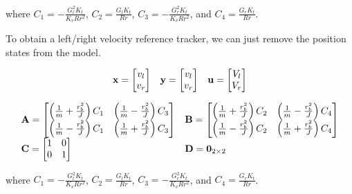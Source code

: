 where $C_1 = -\frac{G_l^2 K_t}{K_v R r^2}$, $C_2 = \frac{G_l K_t}{Rr}$,
$C_3 = -\frac{G_r^2 K_t}{K_v R r^2}$, and $C_4 = \frac{G_r K_t}{Rr}$.

To obtain a left/right velocity \gls{reference} tracker, we can just remove the
position \glspl{state} from the \gls{model}.

\begin{theorem}
  \label{thm:ramsete_decoupled_ref_tracker}
  \begin{equation*}
    \begin{array}{ccc}
      \mathbf{x} =
      \begin{bmatrix}
        v_l \\
        v_r
      \end{bmatrix} &
      \mathbf{y} =
      \begin{bmatrix}
        v_l \\
        v_r
      \end{bmatrix} &
      \mathbf{u} =
      \begin{bmatrix}
        V_l \\
        V_r
      \end{bmatrix}
    \end{array}
  \end{equation*}

  \begin{equation}
    \begin{array}{ll}
      \mathbf{A} =
      \begin{bmatrix}
        \left(\frac{1}{m} + \frac{r_b^2}{J}\right) C_1 &
        \left(\frac{1}{m} - \frac{r_b^2}{J}\right) C_3 \\
        \left(\frac{1}{m} - \frac{r_b^2}{J}\right) C_1 &
        \left(\frac{1}{m} + \frac{r_b^2}{J}\right) C_3
      \end{bmatrix} &
      \mathbf{B} =
      \begin{bmatrix}
        \left(\frac{1}{m} + \frac{r_b^2}{J}\right) C_2 &
        \left(\frac{1}{m} - \frac{r_b^2}{J}\right) C_4 \\
        \left(\frac{1}{m} - \frac{r_b^2}{J}\right) C_2 &
        \left(\frac{1}{m} + \frac{r_b^2}{J}\right) C_4
      \end{bmatrix} \\
      \mathbf{C} =
      \begin{bmatrix}
        1 & 0 \\
        0 & 1 \\
      \end{bmatrix} &
      \mathbf{D} = \mathbf{0}_{2 \times 2}
    \end{array}
  \end{equation}

  where $C_1 = -\frac{G_l^2 K_t}{K_v R r^2}$, $C_2 = \frac{G_l K_t}{Rr}$,
  $C_3 = -\frac{G_r^2 K_t}{K_v R r^2}$, and $C_4 = \frac{G_r K_t}{Rr}$.
\end{theorem}

